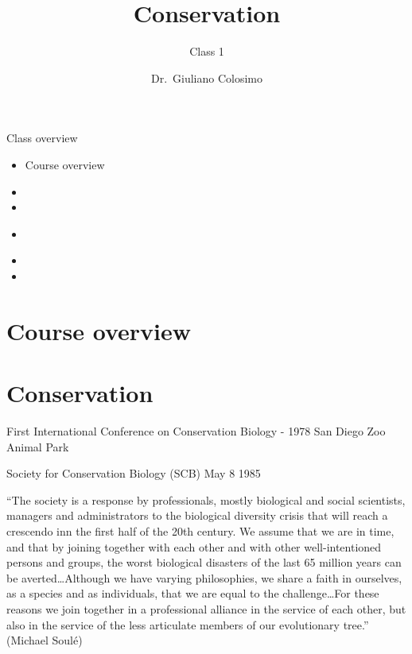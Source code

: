 \documentclass[
  ignorenonframetext,
]{beamer}
\title{Conservation}
\subtitle{Class 1}
\author{Dr.~Giuliano Colosimo}
\date{}
\providecommand{\tightlist}{%
  \setlength{\itemsep}{0pt}\setlength{\parskip}{0pt}}\usepackage{longtable,booktabs,array}
\begin{document}
\frame{\titlepage}
\ifdefined\Shaded\renewenvironment{Shaded}{\begin{tcolorbox}[interior hidden, frame hidden, boxrule=0pt, breakable, sharp corners, borderline west={3pt}{0pt}{shadecolor}, enhanced]}{\end{tcolorbox}}\fi

\begin{frame}{Class overview}
\protect\hypertarget{class-overview}{}
\begin{itemize}
\tightlist
\item
  Course overview
\item
\item
\item \cite{mueller92}
\item
\item
\end{itemize}
\end{frame}

\hypertarget{course-overview}{%
\section{Course overview}\label{course-overview}}

\begin{frame}
\end{frame}

\hypertarget{conservation}{%
\section{Conservation}\label{conservation}}

\begin{frame}
First International Conference on Conservation Biology - 1978 San Diego
Zoo Animal Park

Society for Conservation Biology (SCB) May 8 1985

``The society is a response by professionals, mostly biological and
social scientists, managers and administrators to the biological
diversity crisis that will reach a crescendo inn the first half of the
20th century. We assume that we are in time, and that by joining
together with each other and with other well-intentioned persons and
groups, the worst biological disasters of the last 65 million years can
be averted\ldots Although we have varying philosophies, we share a faith
in ourselves, as a species and as individuals, that we are equal to the
challenge\ldots For these reasons we join together in a professional
alliance in the service of each other, but also in the service of the
less articulate members of our evolutionary tree.'' (Michael Soulé)
\end{frame}
\end{document}

